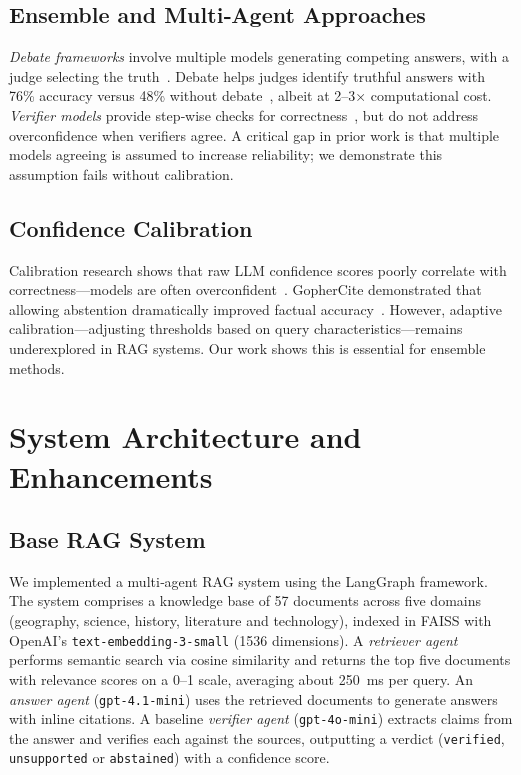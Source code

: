 \documentclass{article}
\begin{document}
\subsection{Ensemble and Multi‑Agent Approaches}

\emph{Debate frameworks} involve multiple models generating competing answers, with a judge selecting the truth~\cite{irving2018debate}. Debate helps judges identify truthful answers with 76\% accuracy versus 48\% without debate~\cite{irving2018debate}, albeit at 2–3× computational cost. \emph{Verifier models} provide step‑wise checks for correctness~\cite{cobbe2021verifiers}, but do not address overconfidence when verifiers agree. A critical gap in prior work is that multiple models agreeing is assumed to increase reliability; we demonstrate this assumption fails without calibration.

\subsection{Confidence Calibration}

Calibration research shows that raw LLM confidence scores poorly correlate with correctness—models are often overconfident~\cite{menick2022gophercite}. GopherCite demonstrated that allowing abstention dramatically improved factual accuracy~\cite{menick2022gophercite}. However, adaptive calibration—adjusting thresholds based on query characteristics—remains underexplored in RAG systems. Our work shows this is essential for ensemble methods.

\section{System Architecture and Enhancements}
\label{sec:system}

\subsection{Base RAG System}

We implemented a multi‑agent RAG system using the LangGraph framework. The system comprises a knowledge base of 57 documents across five domains (geography, science, history, literature and technology), indexed in FAISS with OpenAI’s \texttt{text‑embedding‑3‑small} (1536 dimensions). A \emph{retriever agent} performs semantic search via cosine similarity and returns the top five documents with relevance scores on a 0–1 scale, averaging about 250~ms per query. An \emph{answer agent} (\texttt{gpt‑4.1‑mini}) uses the retrieved documents to generate answers with inline citations. A baseline \emph{verifier agent} (\texttt{gpt‑4o‑mini}) extracts claims from the answer and verifies each against the sources, outputting a verdict (\texttt{verified}, \texttt{unsupported} or \texttt{abstained}) with a confidence score.
\end{document}
